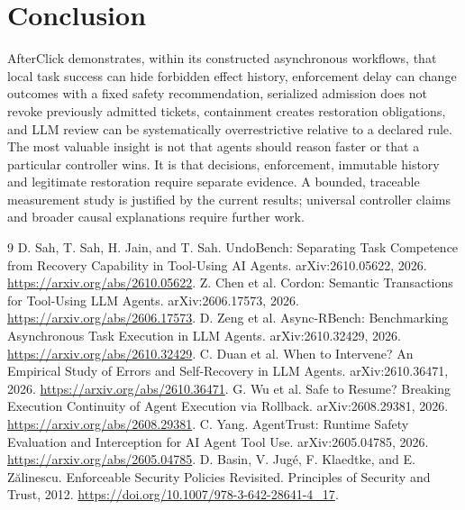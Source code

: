\documentclass[10pt]{article}
\begin{document}
\section{Conclusion}
AfterClick demonstrates, within its constructed asynchronous workflows, that local task success can hide forbidden effect history, enforcement delay can change outcomes with a fixed safety recommendation, serialized admission does not revoke previously admitted tickets, containment creates restoration obligations, and LLM review can be systematically overrestrictive relative to a declared rule. The most valuable insight is not that agents should reason faster or that a particular controller wins. It is that decisions, enforcement, immutable history and legitimate restoration require separate evidence. A bounded, traceable measurement study is justified by the current results; universal controller claims and broader causal explanations require further work.
\clearpage
\begin{thebibliography}{9}\small
{} D. Sah, T. Sah, H. Jain, and T. Sah. UndoBench: Separating Task Competence from Recovery Capability in Tool-Using AI Agents. arXiv:2610.05622, 2026. \url{https://arxiv.org/abs/2610.05622}.
 Z. Chen et al. Cordon: Semantic Transactions for Tool-Using LLM Agents. arXiv:2606.17573, 2026. \url{https://arxiv.org/abs/2606.17573}.
 D. Zeng et al. Async-RBench: Benchmarking Asynchronous Task Execution in LLM Agents. arXiv:2610.32429, 2026. \url{https://arxiv.org/abs/2610.32429}.
 C. Duan et al. When to Intervene? An Empirical Study of Errors and Self-Recovery in LLM Agents. arXiv:2610.36471, 2026. \url{https://arxiv.org/abs/2610.36471}.
 G. Wu et al. Safe to Resume? Breaking Execution Continuity of Agent Execution via Rollback. arXiv:2608.29381, 2026. \url{https://arxiv.org/abs/2608.29381}.
 C. Yang. AgentTrust: Runtime Safety Evaluation and Interception for AI Agent Tool Use. arXiv:2605.04785, 2026. \url{https://arxiv.org/abs/2605.04785}.
 D. Basin, V. Jug\'e, F. Klaedtke, and E. Z\u{a}linescu. Enforceable Security Policies Revisited. Principles of Security and Trust, 2012. \url{https://doi.org/10.1007/978-3-642-28641-4_17}.
\end{thebibliography}
\clearpage
\appendix
\end{document}
